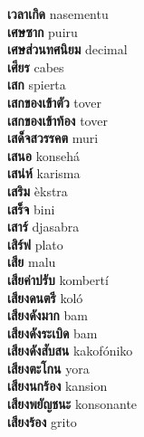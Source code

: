 \textbf{ เวลาเกิด  } nasementu \\
\textbf{ เศษซาก  } puiru \\
\textbf{ เศษส่วนทศนิยม  } decimal \\
\textbf{ เศียร  } cabes \\
\textbf{ เสก  } spierta \\
\textbf{ เสกของเข้าตัว  } tover \\
\textbf{ เสกของเข้าท้อง  } tover \\
\textbf{ เสด็จสวรรคต  } muri \\
\textbf{ เสนอ  } konsehá \\
\textbf{ เสน่ห์  } karisma \\
\textbf{ เสริม  } èkstra \\
\textbf{ เสร็จ  } bini \\
\textbf{ เสาร์  } djasabra \\
\textbf{ เสิร์ฟ  } plato \\
\textbf{ เสีย  } malu \\
\textbf{ เสียค่าปรับ  } kombertí \\
\textbf{ เสียงดนตรี  } koló \\
\textbf{ เสียงดังมาก  } bam \\
\textbf{ เสียงดังระเบิด  } bam \\
\textbf{ เสียงดังสับสน  } kakofóniko \\
\textbf{ เสียงตะโกน  } yora \\
\textbf{ เสียงนกร้อง  } kansion \\
\textbf{ เสียงพยัญชนะ  } konsonante \\
\textbf{ เสียงร้อง  } grito \\
